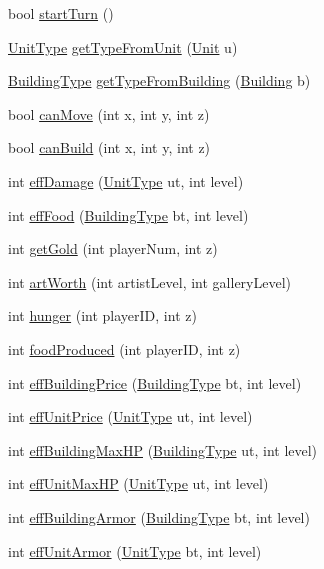 \begin{CompactItemize}
\item 
bool \hyperlink{classBaseAI_c6303df0fece47e29b77dd0aa0aa4fe8}{startTurn} ()
\item 
\hyperlink{classUnitType}{UnitType} \hyperlink{classBaseAI_9bd3c6a1259db084fa6780d50bea95eb}{getTypeFromUnit} (\hyperlink{classUnit}{Unit} u)
\item 
\hyperlink{classBuildingType}{BuildingType} \hyperlink{classBaseAI_ca41bf18cdb670b9bcc5fe92eae198ad}{getTypeFromBuilding} (\hyperlink{classBuilding}{Building} b)
\item 
bool \hyperlink{classBaseAI_45d4571f72aa781ba2db4cd46311ced3}{canMove} (int x, int y, int z)
\item 
bool \hyperlink{classBaseAI_05c91f733ed1598a95d4e7c357e0a0c4}{canBuild} (int x, int y, int z)
\item 
int \hyperlink{classBaseAI_0643622ad827a6ad035bf84dfdfacd55}{effDamage} (\hyperlink{classUnitType}{UnitType} ut, int level)
\item 
int \hyperlink{classBaseAI_ec102e33572b1f58df437260bf73141e}{effFood} (\hyperlink{classBuildingType}{BuildingType} bt, int level)
\item 
int \hyperlink{classBaseAI_c079405ee4fd5cec789af0f627d3d175}{getGold} (int playerNum, int z)
\item 
int \hyperlink{classBaseAI_9a6e10da16c3b209915251ca183815e7}{artWorth} (int artistLevel, int galleryLevel)
\item 
int \hyperlink{classBaseAI_e1677c15b8b022dd7335eeb84b57b30f}{hunger} (int playerID, int z)
\item 
int \hyperlink{classBaseAI_43314f174d849c294ec84a09af6b55e2}{foodProduced} (int playerID, int z)
\item 
int \hyperlink{classBaseAI_d49ab218e79412c1ce975159688e6cfd}{effBuildingPrice} (\hyperlink{classBuildingType}{BuildingType} bt, int level)
\item 
int \hyperlink{classBaseAI_680e404005de9fdc4165652ea5dcc95e}{effUnitPrice} (\hyperlink{classUnitType}{UnitType} ut, int level)
\item 
int \hyperlink{classBaseAI_80e0275443af5146969878b3802acbe7}{effBuildingMaxHP} (\hyperlink{classBuildingType}{BuildingType} ut, int level)
\item 
int \hyperlink{classBaseAI_0977f4ba22e8b97f89d7b0c03941c788}{effUnitMaxHP} (\hyperlink{classUnitType}{UnitType} ut, int level)
\item 
int \hyperlink{classBaseAI_1de8bdc9274ca62632b9fb7caf55800e}{effBuildingArmor} (\hyperlink{classBuildingType}{BuildingType} bt, int level)
\item 
int \hyperlink{classBaseAI_8606081fe230982963a8cdf820822a19}{effUnitArmor} (\hyperlink{classUnitType}{UnitType} bt, int level)
\end{CompactItemize}
